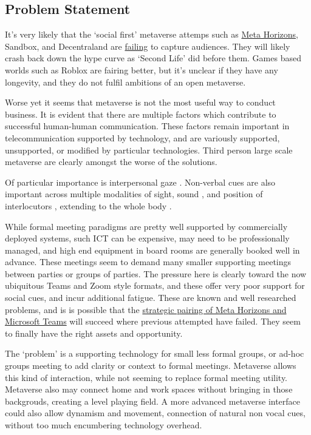 \subsection{Problem Statement}
It's very likely that the `social first' metaverse attemps such as \href{https://www.theverge.com/2022/10/6/23391895/meta-facebook-horizon-worlds-vr-social-network-too-buggy-leaked-memo}{Meta Horizons}, Sandbox, and Decentraland are \href{https://www.coindesk.com/web3/2022/10/07/its-lonely-in-the-metaverse-decentralands-38-daily-active-users-in-a-13b-ecosystem/}{failing} to capture audiences. They will likely crash back down the hype curve as `Second Life' did before them. Games based worlds such as Roblox are fairing better, but it's unclear if they have any longevity, and they do not fulfil ambitions of an open metaverse.\par 
Worse yet it seems that metaverse is not the most useful way to conduct business. It is evident that there are multiple factors which contribute to successful human-human communication. These factors remain important in telecommunication supported by technology, and are variously supported, unsupported, or modified by particular technologies. Third person large scale metaverse are clearly amongst the worse of the solutions.\par
Of particular importance is interpersonal gaze \cite{Cook1977, Kleinke1986, Fagel2010}. Non-verbal cues are also important across multiple modalities of sight, sound \cite{Otsuka2005}, and position of interlocutors \cite{Kendon1967}, extending to the whole body \cite{Kleinke1986, Nguyen2009}.\par
While formal meeting paradigms are pretty well supported by commercially deployed systems, such ICT can be expensive, may need to be professionally managed, and high end equipment in board rooms are generally booked well in advance. These meetings seem to demand many smaller supporting meetings between parties or groups of parties. The pressure here is clearly toward the now ubiquitous Teams and Zoom style formats, and these offer very poor support for social cues, and incur additional fatigue. These are known and well researched problems, and is is possible that the \href{https://www.oculus.com/blog/future-of-work-meta-connect-2022-quest-pro-microsoft-accenture/?}{strategic pairing of Meta Horizons and Microsoft Teams} will succeed where previous attempted have failed. They seem to finally have the right assets and opportunity. \par
The `problem' is a supporting technology for small less formal groups, or ad-hoc groups meeting to add clarity or context to formal meetings. Metaverse allows this kind of interaction, while not seeming to replace formal meeting utility. Metaverse also may connect home and work spaces without bringing in those backgrouds, creating a level playing field. A more advanced metaverse interface could also allow dynamism and movement, connection of natural non vocal cues, without too much encumbering technology overhead.
